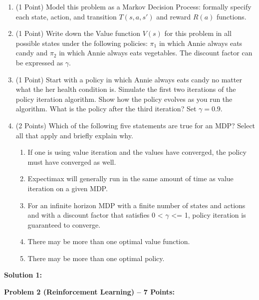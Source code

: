 \documentclass[]{article}
\begin{document}
\begin{enumerate}[label=(\alph*)]
    \item (1 Point) Model this problem as a Markov Decision Process: formally specify each state, action, and transition $T(s,a,s')$ and reward $R(a)$ functions.
    \item (1 Point) Write down the Value function $V(s)$ for this problem in all possible states under the following policies: $\pi_1$ in which Annie always eats candy and $\pi_2$ in which Annie always eats vegetables. The discount factor can be expressed as $\gamma$.
    \item (1 Point) Start with a policy in which Annie always eats candy no matter what the her health condition is. Simulate the first two iterations of the policy iteration algorithm. Show how the policy evolves as you run the algorithm. What is the policy after the third iteration? Set $\gamma = 0.9$.
    \item (2 Points) Which of the following five statements are true for an MDP? Select all that apply and briefly explain why.
    \begin{enumerate}[label=(\roman*)]
        \item If one is using value iteration and the values have converged, the policy must have converged as well.
        \item Expectimax will generally run in the same amount of time as value iteration on a given MDP.
        \item For an infinite horizon MDP with a finite number of states and actions and with a discount factor that satisfies 0 < $\gamma$ <= 1, policy iteration is guaranteed to converge.
        \item There may be more than one optimal value function.
        \item There may be more than one optimal policy.
    \end{enumerate}
\end{enumerate}

\bigskip

\textbf{Solution 1:}

\clearpage

\textbf{Problem 2 (Reinforcement Learning) -- 7 Points:}
\end{document}
